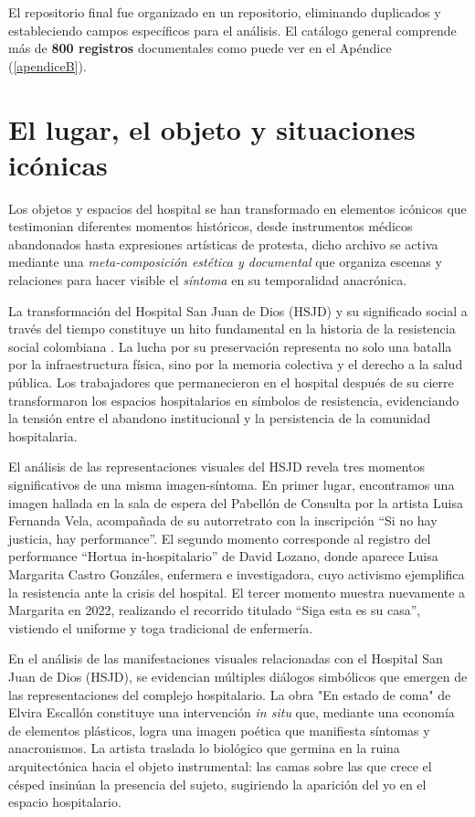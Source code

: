El repositorio final fue organizado en un repositorio, eliminando duplicados y estableciendo campos específicos para el análisis. El catálogo general comprende más de \textbf{800 registros} documentales como puede ver en el Apéndice (\ref{apendiceB}).


\section{El lugar, el objeto y situaciones icónicas}

Los objetos y espacios del hospital se han transformado en elementos icónicos que testimonian diferentes momentos históricos, desde instrumentos médicos abandonados hasta expresiones artísticas de protesta, \textcolor{edit30sept}{dicho archivo se activa mediante una \textit{meta-composición estética y documental} que organiza escenas y relaciones para hacer visible el \textit{síntoma} en su temporalidad anacrónica.}

La transformación del Hospital San Juan de Dios (HSJD) y su significado social a través del tiempo constituye un hito fundamental en la historia de la resistencia social colombiana \parencite{Gongora2013}. La lucha por su preservación representa no solo una batalla por la infraestructura física, sino por la memoria colectiva y el derecho a la salud pública. Los trabajadores que permanecieron en el hospital después de su cierre transformaron los espacios hospitalarios en símbolos de resistencia, evidenciando la tensión entre el abandono institucional y la persistencia de la comunidad hospitalaria.

El análisis de las representaciones visuales del HSJD revela tres momentos significativos de una misma imagen-síntoma. En primer lugar, encontramos una imagen hallada en la sala de espera del Pabellón de Consulta por la artista Luisa Fernanda Vela, acompañada de su autorretrato con la inscripción \enquote{Si no hay justicia, hay performance}. El segundo momento corresponde al registro del performance \enquote{Hortua in-hospitalario} de David Lozano, donde aparece Luisa Margarita Castro Gonzáles, enfermera e investigadora, cuyo activismo ejemplifica la resistencia ante la crisis del hospital. El tercer momento muestra nuevamente a Margarita en 2022, realizando el recorrido titulado \enquote{Siga esta es su casa}, vistiendo el uniforme y toga tradicional de enfermería.

En el análisis de las manifestaciones visuales relacionadas con el Hospital San Juan de Dios (HSJD), se evidencian múltiples diálogos simbólicos que emergen de las representaciones del complejo hospitalario. La obra "En estado de coma" de Elvira Escallón constituye una intervención \textit{in situ} que, mediante una economía de elementos plásticos, logra una imagen poética que manifiesta síntomas y anacronismos. La artista traslada lo biológico que germina en la ruina arquitectónica hacia el objeto instrumental: las camas sobre las que crece el césped insinúan la presencia del sujeto, sugiriendo la aparición del yo en el espacio hospitalario.


